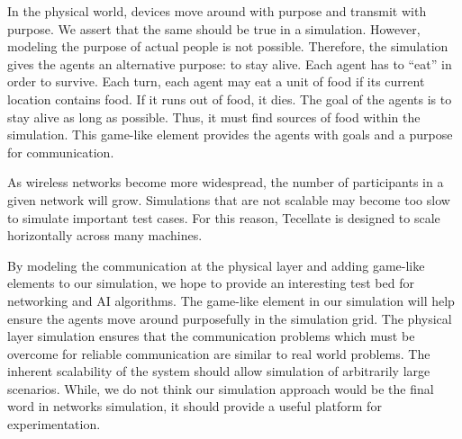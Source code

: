 \documentclass[12pt]{article}
\begin{document}
In the physical world, devices move around with purpose and transmit with purpose. We assert that
the same should be true in a simulation. However, modeling the purpose of actual people is not
possible. Therefore, the simulation gives the agents an alternative purpose: to stay alive. Each
agent has to ``eat'' in order to survive. Each turn, each agent may eat a unit of food if its
current location contains food. If it runs out of food, it dies. The goal of the agents is to stay
alive as long as possible. Thus, it must find sources of food within the simulation. This game-like
element provides the agents with goals and a purpose for communication.

As wireless networks become more widespread, the number of participants in a given network will
grow. Simulations that are not scalable may become too slow to simulate important test cases. For
this reason, Tecellate is designed to scale horizontally across many machines.

By modeling the communication at the physical layer and adding game-like elements to our simulation,
we hope to provide an interesting test bed for networking and AI algorithms. The game-like element
in our simulation will help ensure the agents move around purposefully in the simulation grid. The
physical layer simulation ensures that the communication problems which must be overcome for
reliable communication are similar to real world problems. The inherent scalability of the system
should allow simulation of arbitrarily large scenarios. While, we do not think our simulation
approach would be the final word in networks simulation, it should provide a useful platform for
experimentation.











\nocite{*}


\end{document}
